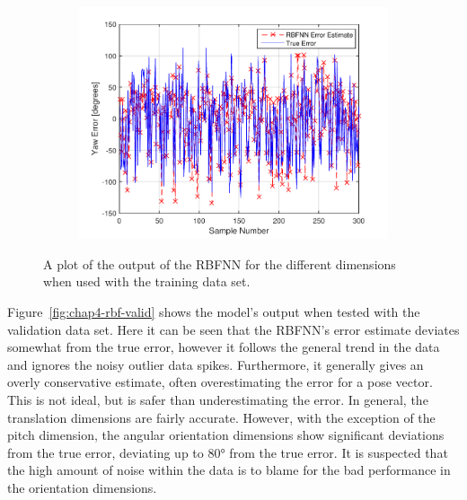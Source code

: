 \begin{figure}
\begin{subfigure}{0.3\textwidth}
    \includegraphics[width=\textwidth]{figures/chapter4/yaw_train}
    \caption{}
  \end{subfigure}
  \caption[The output of the RBFNN when used with the training set input.]{A plot of the output of the RBFNN for the different dimensions when used with the training data set.}
  \label{fig:chap4-rbf-train}
\end{figure}

Figure~\ref{fig:chap4-rbf-valid} shows the model's output when tested with the validation data set. Here it can be seen that the RBFNN's error estimate deviates somewhat from the true error, however it follows the general trend in the data and ignores the noisy outlier data spikes. Furthermore, it generally gives an overly conservative estimate, often overestimating the error for a pose vector. This is not ideal, but is safer than underestimating the error. In general, the translation dimensions are fairly accurate. However, with the exception of the pitch dimension, the angular orientation dimensions show significant deviations from the true error, deviating up to $\ang{80}$ from the true error. It is suspected that the high amount of noise within the data is to blame for the bad performance in the orientation dimensions. 

